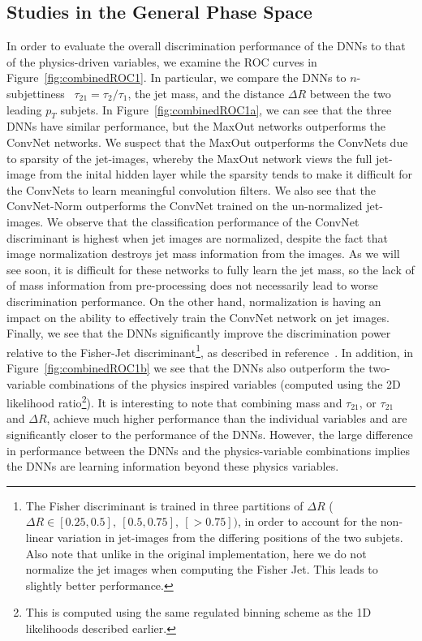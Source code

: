 
\subsection{Studies in the General Phase Space} %
\label{sub:coarse_studies}

In order to evaluate the overall discrimination performance of the DNNs to that of the physics-driven variables, we examine the ROC curves in Figure~\ref{fig:combinedROC1}. In particular, we compare the DNNs to $n$-subjettiness~\cite{nsub} $\tau_{21} = \tau_{2}/\tau_{1}$, the jet mass, and the distance $\Delta R$ between the two leading $p_{T}$ subjets.  In Figure~\ref{fig:combinedROC1a}, we can see that the three DNNs have similar performance, but the MaxOut networks outperforms the ConvNet networks.  We suspect that the MaxOut outperforms the ConvNets due to sparsity of the jet-images, whereby the MaxOut network views the full jet-image from the inital hidden layer while the sparsity tends to make it difficult for the ConvNets to learn meaningful convolution filters.  We also see that the ConvNet-Norm outperforms the ConvNet trained on the un-normalized jet-images.  We observe that the classification performance of the ConvNet discriminant is highest when jet images are normalized, despite the fact that image normalization destroys jet mass information from the images. As we will see soon, it is difficult for these networks to fully learn the jet mass, so the lack of of mass information from pre-processing does not necessarily lead to worse discrimination performance. On the other hand, normalization is having an impact on the ability to effectively train the ConvNet network on jet images.  Finally, we see that the DNNs significantly improve the discrimination power relative to the Fisher-Jet discriminant\footnote{The Fisher discriminant is trained in three partitions of $\Delta  R$ ($\Delta R \in [0.25, 0.5],\ [0.5, 0.75],\ [>0.75])$, in order to account for the non-linear variation in jet-images from the differing positions of the two subjets.  Also note that unlike in the original implementation, here we do not normalize the jet images when computing the Fisher Jet.  This leads to slightly better performance.}, as described in reference~\cite{Cogan:2014oua}. In addition, in Figure~\ref{fig:combinedROC1b} we see that the DNNs also outperform the two-variable combinations of the physics inspired variables (computed using the 2D likelihood ratio\footnote{This is computed using the same regulated binning scheme as the 1D likelihoods described earlier.}).   It is interesting to note that combining mass and $\tau_{21}$, or $\tau_{21}$ and $\Delta R$, achieve much higher performance than the individual variables and are significantly closer to the performance of the DNNs.  However, the large difference in performance between the DNNs and the physics-variable combinations implies the DNNs are learning information beyond these physics variables.
